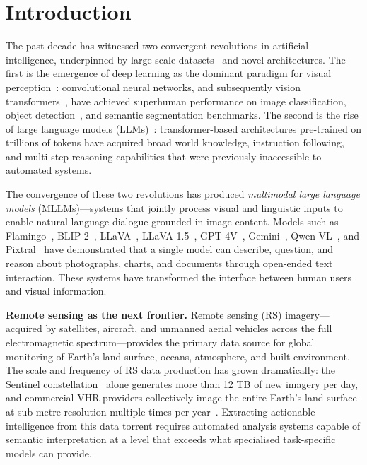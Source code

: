 
\section{Introduction}\label{sec1}

The past decade has witnessed two convergent revolutions in artificial intelligence, underpinned by large-scale datasets~\cite{geoprivacy2024,long2021creating} and novel architectures.
The first is the emergence of deep learning as the dominant paradigm for visual
perception~\cite{lecun2015deep}: convolutional neural networks, and subsequently
vision transformers~\cite{dosovitskiy2021vit}, have achieved superhuman performance
on image classification, object detection~\cite{ren2015faster,cheng2016rotated}, and semantic
segmentation benchmarks. The second is the rise of large language models
(LLMs)~\cite{brown2020gpt3,touvron2023llama}: transformer-based architectures
pre-trained on trillions of tokens have acquired broad world knowledge, instruction
following, and multi-step reasoning capabilities that were previously inaccessible
to automated systems.

The convergence of these two revolutions has produced \emph{multimodal large language
models} (MLLMs)---systems that jointly process visual and linguistic inputs to enable
natural language dialogue grounded in image content. Models such as
Flamingo~\cite{flamingo2022}, BLIP-2~\cite{blip22023}, LLaVA~\cite{llava2023}, LLaVA-1.5~\cite{llava15_2023},
GPT-4V~\cite{gpt4v2023}, Gemini~\cite{gemini2023}, Qwen-VL~\cite{qwen_vl2023}, and Pixtral~\cite{pixtral2024} have demonstrated that a single
model can describe, question, and reason about photographs, charts, and documents
through open-ended text interaction. These systems have transformed the interface
between human users and visual information.

\textbf{Remote sensing as the next frontier.}
Remote sensing (RS) imagery---acquired by satellites, aircraft, and unmanned aerial
vehicles across the full electromagnetic spectrum---provides the primary data
source for global monitoring of Earth's land surface, oceans, atmosphere, and
built environment. The scale and frequency of RS data production has grown
dramatically: the Sentinel constellation~\cite{esa2023sentinel} alone generates
more than 12 TB of new imagery per day, and commercial VHR providers collectively
image the entire Earth's land surface at sub-metre resolution multiple times per
year~\cite{globalsat2024}. Extracting actionable intelligence from this data
torrent requires automated analysis systems capable of semantic interpretation
at a level that exceeds what specialised task-specific models can provide.

